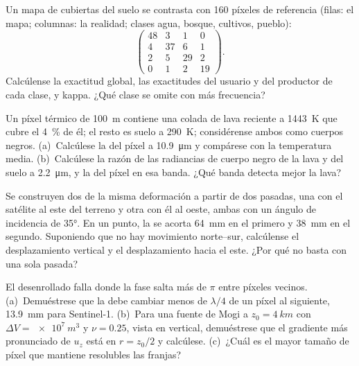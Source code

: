 \begin{exercise}[$\star\star$]\label{exo:b3:remote-sensing-gis:8}
Un mapa de cubiertas del suelo se contrasta con 160 píxeles de referencia (filas: el mapa;
columnas: la realidad; clases agua, bosque, cultivos, pueblo):
\[
\begin{pmatrix} 48 & 3 & 1 & 0 \\ 4 & 37 & 6 & 1 \\ 2 & 5 & 29 & 2 \\ 0 & 1 & 2 & 19 \end{pmatrix} .
\]
Calcúlense la exactitud global, las exactitudes del usuario y del productor de cada
clase, y kappa. ¿Qué clase se omite con más frecuencia?
\end{exercise}

\begin{exercise}[$\star\star$]\label{exo:b3:remote-sensing-gis:9}
Un píxel térmico de \qty{100}{m} contiene una colada de lava reciente a \qty{1443}{K}
que cubre el \qty{4}{\percent} de él; el resto es suelo a \qty{290}{K}; considérense
ambos como cuerpos negros. (a)~Calcúlese la  del píxel
a \qty{10.9}{\micro\metre} y compárese con la temperatura media.
(b)~Calcúlese la razón de las radiancias de cuerpo negro de la lava y del
suelo a \qty{2.2}{\micro\metre}, y la  del
píxel en esa banda. ¿Qué banda detecta mejor la lava?
\end{exercise}

\begin{exercise}[$\star\star\star$]\label{exo:b3:remote-sensing-gis:10}
Se construyen dos  de la misma deformación a partir de dos pasadas, una
con el satélite al este del terreno y otra con él al oeste,
ambas con un ángulo de incidencia de \ang{35}. En un punto, la
 se acorta \qty{64}{mm} en el primero y \qty{38}{mm} en el
segundo. Suponiendo que no hay movimiento norte--sur, calcúlense el desplazamiento vertical y el
desplazamiento hacia el este. ¿Por qué no basta con una sola pasada?
\end{exercise}

\begin{exercise}[$\star\star\star$]\label{exo:b3:remote-sensing-gis:11}
El desenrollado falla donde la fase salta más de $\pi$ entre
píxeles vecinos. (a)~Demuéstrese que la  debe cambiar menos de $\lambda/4$ de un
píxel al siguiente, \qty{13.9}{mm} para
Sentinel-1. (b)~Para una fuente de Mogi a $z_0 = \qty{4}{km}$ con $\Delta V =
\qty{e7}{m^3}$ y $\nu = 0.25$, vista en vertical, demuéstrese que el
gradiente más pronunciado de $u_z$ está en $r = z_0/2$ y calcúlese. (c)~¿Cuál es el
mayor tamaño de píxel que mantiene resolubles las franjas?
\end{exercise}

